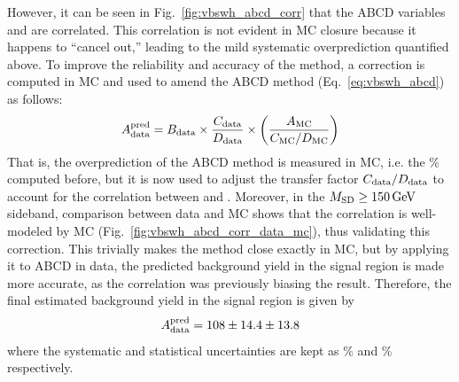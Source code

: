 However, it can be seen in Fig.~\ref{fig:vbswh_abcd_corr} that the ABCD variables \detajj and \MSD are correlated.
This correlation is not evident in MC closure because it happens to ``cancel out,'' leading to the mild systematic overprediction quantified above. 
To improve the reliability and accuracy of the method, a correction is computed in MC and used to amend the ABCD method (Eq.~\ref{eq:vbswh_abcd}) as follows:
\begin{equation*}
    A_{\text{data}}^\text{pred} = B_{\text{data}}\times\frac{C_{\text{data}}}{D_{\text{data}}}\times\bigg(\frac{A_{\mathrm{MC}}}{C_{\mathrm{MC}}/D_{\mathrm{MC}}}\bigg)
\end{equation*}
That is, the overprediction of the ABCD method is measured in MC, i.e. the \BkgEstTotalSystErr\% computed before, but it is now used to adjust the transfer factor $C_{\text{data}}/D_{\text{data}}$ to account for the correlation between \MSD and \detajj. 
Moreover, in the $M_{\mathrm{SD}} \geq 150\,\text{Ge\hspace{-.08em}V}$ sideband, comparison between data and MC shows that the correlation is well-modeled by MC (Fig.~\ref{fig:vbswh_abcd_corr_data_mc}), thus validating this correction. 
This trivially makes the method close exactly in MC, but by applying it to ABCD in data, the predicted background yield in the signal region is made more accurate, as the correlation was previously biasing the result.
Therefore, the final estimated background yield in the signal region is given by
\begin{equation*}
    A_{\text{data}}^{\text{pred}} = 108 \pm 14.4 \pm 13.8
\end{equation*}
where the systematic and statistical uncertainties are kept as \BkgEstTotalSystErr\% and \BkgEstStatErr\% respectively.

